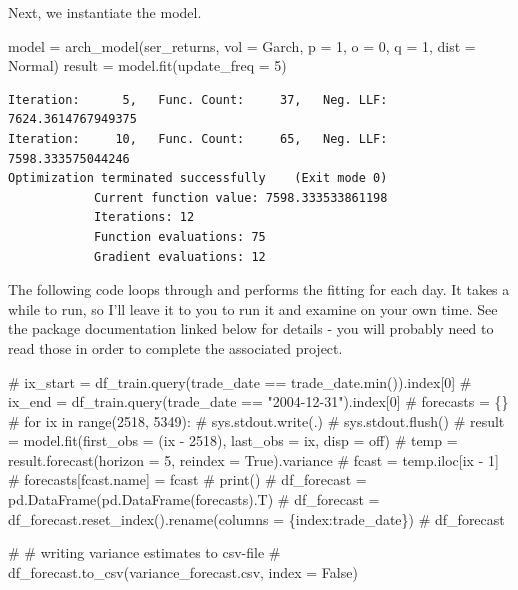 \documentclass[
  letterpaper,
  DIV=11,
  numbers=noendperiod]{scrreprt}
\newenvironment{Shaded}{\begin{snugshade}}{\end{snugshade}}
\newcommand{\CommentTok}[1]{\textcolor[rgb]{0.37,0.37,0.37}{#1}}
\newcommand{\DecValTok}[1]{\textcolor[rgb]{0.68,0.00,0.00}{#1}}
\newcommand{\NormalTok}[1]{\textcolor[rgb]{0.00,0.23,0.31}{#1}}
\newcommand{\OperatorTok}[1]{\textcolor[rgb]{0.37,0.37,0.37}{#1}}
\newcommand{\StringTok}[1]{\textcolor[rgb]{0.13,0.47,0.30}{#1}}
\begin{document}
Next, we instantiate the model.

\begin{Shaded}
\begin{Highlighting}[]
\NormalTok{model }\OperatorTok{=}\NormalTok{ arch\_model(ser\_returns, vol }\OperatorTok{=} \StringTok{\textquotesingle{}Garch\textquotesingle{}}\NormalTok{, p }\OperatorTok{=} \DecValTok{1}\NormalTok{, o }\OperatorTok{=} \DecValTok{0}\NormalTok{, q }\OperatorTok{=} \DecValTok{1}\NormalTok{, dist }\OperatorTok{=} \StringTok{\textquotesingle{}Normal\textquotesingle{}}\NormalTok{)}
\NormalTok{result }\OperatorTok{=}\NormalTok{ model.fit(update\_freq }\OperatorTok{=} \DecValTok{5}\NormalTok{)}
\end{Highlighting}
\end{Shaded}

\begin{verbatim}
Iteration:      5,   Func. Count:     37,   Neg. LLF: 7624.3614767949375
Iteration:     10,   Func. Count:     65,   Neg. LLF: 7598.333575044246
Optimization terminated successfully    (Exit mode 0)
            Current function value: 7598.333533861198
            Iterations: 12
            Function evaluations: 75
            Gradient evaluations: 12
\end{verbatim}

The following code loops through and performs the fitting for each day.
It takes a while to run, so I'll leave it to you to run it and examine
on your own time. See the package documentation linked below for details
- you will probably need to read those in order to complete the
associated project.

\begin{Shaded}
\begin{Highlighting}[]
\CommentTok{\# ix\_start = df\_train.query(\textquotesingle{}trade\_date == trade\_date.min()\textquotesingle{}).index[0]}
\CommentTok{\# ix\_end = df\_train.query(\textquotesingle{}trade\_date == "2004{-}12{-}31"\textquotesingle{}).index[0]}
\CommentTok{\# forecasts = \{\}}
\CommentTok{\# for ix in range(2518, 5349):}
\CommentTok{\#     sys.stdout.write(\textquotesingle{}.\textquotesingle{})}
\CommentTok{\#     sys.stdout.flush()}
\CommentTok{\#     result = model.fit(first\_obs = (ix {-} 2518), last\_obs = ix, disp = \textquotesingle{}off\textquotesingle{})}
\CommentTok{\#     temp = result.forecast(horizon = 5, reindex = True).variance}
\CommentTok{\#     fcast = temp.iloc[ix {-} 1]}
\CommentTok{\#     forecasts[fcast.name] = fcast}
\CommentTok{\# print()}
\CommentTok{\# df\_forecast = pd.DataFrame(pd.DataFrame(forecasts).T)}
\CommentTok{\# df\_forecast = df\_forecast.reset\_index().rename(columns = \{\textquotesingle{}index\textquotesingle{}:\textquotesingle{}trade\_date\textquotesingle{}\})}
\CommentTok{\# df\_forecast}

\CommentTok{\# \# writing variance estimates to csv{-}file}
\CommentTok{\# df\_forecast.to\_csv(\textquotesingle{}variance\_forecast.csv\textquotesingle{}, index = False)}
\end{Highlighting}
\end{Shaded}
\end{document}
